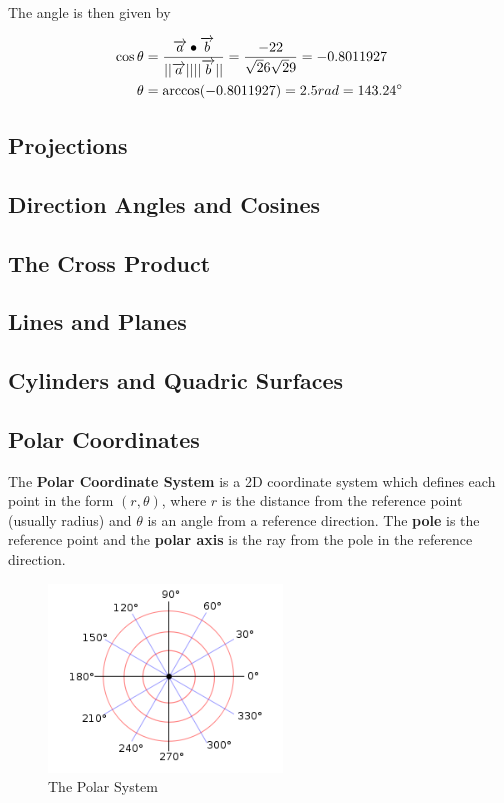         \noindent The angle is then given by

        \begin{align*}
            \cos{\theta} &= \frac{\overrightarrow{a}\bullet\overrightarrow{b}}{||\overrightarrow{a}||||\overrightarrow{b}||}=\frac{-22}{\sqrt26\sqrt29}=-0.8011927\\
            \theta &= \arccos(-0.8011927)=2.5 rad = 143.24\degree
        \end{align*}



    \pagebreak
    \subsection{Projections}
    \subsection{Direction Angles and Cosines}
    \subsection{The Cross Product}
    \subsection{Lines and Planes}
    \subsection{Cylinders and Quadric Surfaces}
    \pagebreak



    \subsection{Polar Coordinates}
        The \textbf{Polar Coordinate System} is a 2D coordinate system which defines each point
        in the form $(r,\theta)$, where $r$ is the distance from the reference point
        (usually radius) and $\theta$ is an angle from a reference direction. The
        \textbf{pole} is the reference point and the \textbf{polar axis} is the ray from the
        pole in the reference direction. \\

        \begin{figure} [hbt!]
            \centering
            \includegraphics[scale=0.8]{Resources/Unit3Vectors/polar.PNG}
            \caption*{The Polar System}
        \end{figure}

